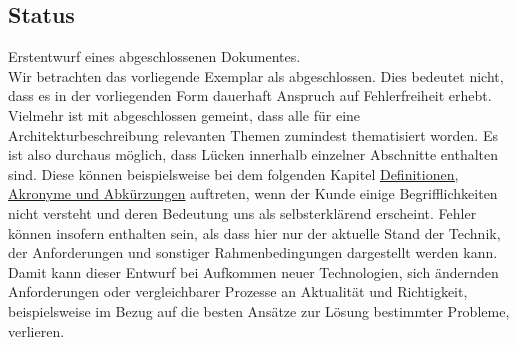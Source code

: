 \documentclass[enabledeprecatedfontcommands,fontsize=11pt,paper=a4,twoside]{scrartcl}
\newcounter{one}
\begin{document}
	\subsection{Status}
	Erstentwurf eines abgeschlossenen Dokumentes. \\
	Wir betrachten das vorliegende Exemplar als abgeschlossen. Dies bedeutet nicht, dass es in der vorliegenden Form dauerhaft Anspruch auf Fehlerfreiheit erhebt. Vielmehr ist mit abgeschlossen gemeint, dass alle für eine Architekturbeschreibung relevanten Themen zumindest thematisiert worden. Es ist also durchaus möglich, dass Lücken innerhalb einzelner Abschnitte enthalten sind. Diese können beispielsweise bei dem folgenden Kapitel \hyperref[sec:daa]{Definitionen, Akronyme und Abkürzungen} auftreten, wenn der Kunde einige Begrifflichkeiten nicht versteht und deren Bedeutung uns als selbsterklärend erscheint. Fehler können insofern enthalten sein, als dass hier nur der aktuelle Stand der Technik, der Anforderungen und sonstiger Rahmenbedingungen dargestellt werden kann. Damit kann dieser Entwurf bei Aufkommen neuer Technologien, sich ändernden Anforderungen oder vergleichbarer Prozesse an Aktualität und Richtigkeit, beispielsweise im Bezug auf die besten Ansätze zur Lösung bestimmter Probleme, verlieren.
	
	\newpage
\end{document}
